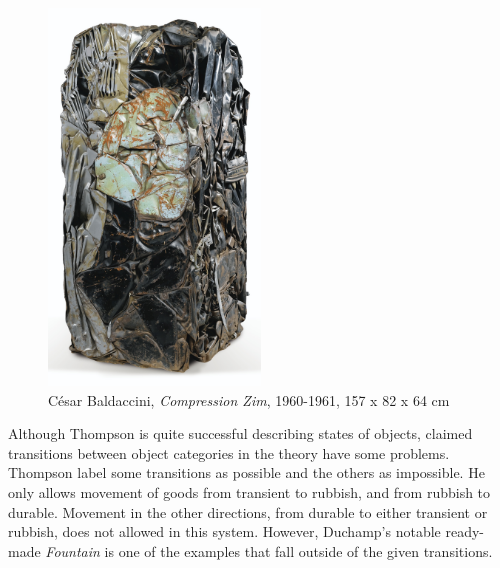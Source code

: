 \begin{figure}[h!]
  \centering
  \includegraphics[height=10cm]{graphics/Cesar_Zim.jpg}
  \caption{César Baldaccini, \textit{Compression Zim}, 1960-1961, 157 x 82 x 64 cm}
  \label{fig:Cesar_Zim}
\end{figure}

Although Thompson is quite successful describing states of objects, claimed transitions between object categories in the theory have some problems. Thompson label some transitions as possible and the others as impossible. He only allows movement of goods from transient to rubbish, and from rubbish to durable. Movement in the other directions, from durable to either transient or rubbish, does not allowed in this system. However, Duchamp’s notable ready-made \textit{Fountain} is one of the examples that fall outside of the given transitions.

